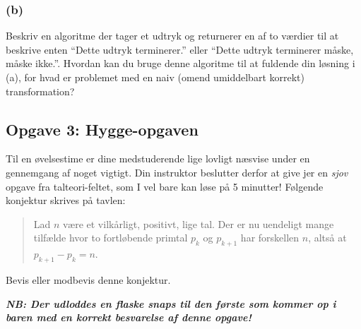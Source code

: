 \subsubsection{(b)}

Beskriv en algoritme der tager et udtryk og returnerer en af to værdier til at
beskrive enten ``Dette udtryk terminerer.'' eller ``Dette udtryk terminerer
måske, måske ikke.''.  Hvordan kan du bruge denne algoritme til at fuldende din
løsning i (a), for hvad er problemet med en naiv (omend umiddelbart korrekt)
transformation?


\subsection{Opgave 3: Hygge-opgaven}


Til en øvelsestime er dine medstuderende lige lovligt næsvise under en
gennemgang af noget vigtigt.  Din instruktor beslutter derfor at give jer en
\emph{sjov} opgave fra talteori-feltet, som I vel bare kan løse på 5 minutter!
Følgende konjektur skrives på tavlen:

\begin{quote}
  Lad $n$ være et vilkårligt, positivt, lige tal.  Der er nu uendeligt mange
  tilfælde hvor to fortløbende primtal $p_k$ og $p_{k+1}$ har forskellen $n$,
  altså at $p_{k+1} - p_k = n$.
\end{quote}

Bevis eller modbevis denne konjektur.

\vspace{.1in} \textbf{\emph{NB: Der udloddes en flaske snaps til den første som
    kommer op i baren med en korrekt besvarelse af denne opgave!}}



\setlength{\parindent}{0mm}
